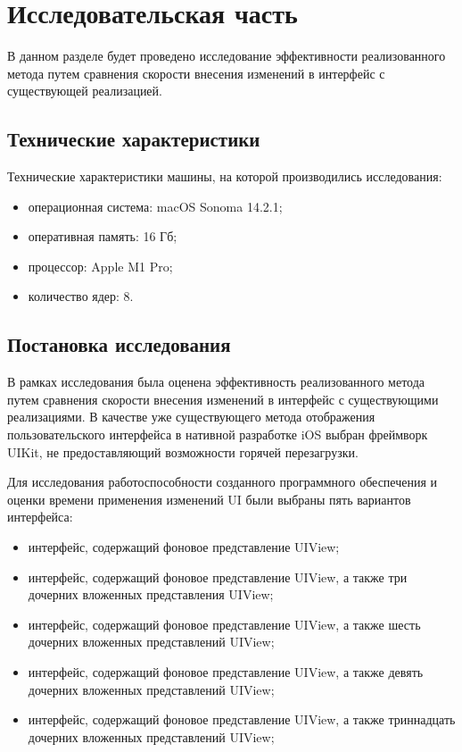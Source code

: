 \section{Исследовательская часть}

В данном разделе будет проведено исследование эффективности реализованного метода путем сравнения скорости внесения изменений в интерфейс с существующей реализацией.

\subsection{Технические характеристики}

Технические характеристики машины, на которой производились исследования:
\begin{itemize}[label=---]
	\item операционная система: macOS Sonoma 14.2.1;
	\item оперативная память: 16 Гб;
	\item процессор: Apple M1 Pro;
	 \item количество ядер: 8.
\end{itemize}

\subsection{Постановка исследования}

В рамках исследования была оценена эффективность реализованного метода путем сравнения скорости внесения изменений в интерфейс с существующими реализациями.
В качестве уже существующего метода отображения пользовательского интерфейса в нативной разработке iOS выбран фреймворк UIKit, не предоставляющий возможности горячей перезагрузки.

Для исследования работоспособности созданного программного обеспечения и оценки времени применения изменений UI были выбраны пять вариантов интерфейса:
\begin{itemize}[label=---]
	\item интерфейс, содержащий фоновое представление UIView;
	\item интерфейс, содержащий фоновое представление UIView, а также три дочерних вложенных представления UIView;
	\item интерфейс, содержащий фоновое представление UIView, а также шесть дочерних вложенных представлений UIView;
	\item интерфейс, содержащий фоновое представление UIView, а также девять дочерних вложенных представлений UIView;
	\item интерфейс, содержащий фоновое представление UIView, а также триннадцать дочерних вложенных представлений UIView;
\end{itemize}	

